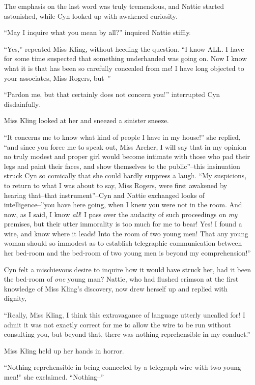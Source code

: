 The emphasis on the last word was truly tremendous, and Nattie started
astonished, while Cyn looked up with awakened curiosity.

``May I inquire what you mean by all?'' inquired Nattie stiffly.

``Yes,'' repeated Miss Kling, without heeding the question. ``I know ALL. I
have for some time suspected that something underhanded was going on.
Now I know what it is that has been so carefully concealed from me! I
have long objected to your associates, Miss Rogers, but--''

``Pardon me, but that certainly does not concern you!'' interrupted Cyn
disdainfully.

Miss Kling looked at her and sneezed a sinister sneeze.

``It concerns me to know what kind of people I have in my house!'' she
replied, ``and since you force me to speak out, Miss Archer, I will say
that in my opinion no truly modest and proper girl would become intimate
with those who pad their legs and paint their faces, and show themselves
to the public''--this insinuation struck Cyn so comically that she could
hardly suppress a laugh. ``My suspicions, to return to what I was about
to say, Miss Rogers, were first awakened by hearing that--that
instrument''--Cyn and Nattie exchanged looks of intelligence--''you have
here going, when I knew you were not in the room. And now, as I said, I
know \emph{all}! I pass over the audacity of such proceedings on \emph{my} premises,
but their utter immorality is too much for me to bear! Yes! I found a
wire, and know where it leads! Into the room of two young men! That any
young woman should so immodest as to establish telegraphic communication
between her bed-room and the bed-room of two young men is beyond my
comprehension!''

Cyn felt a mischievous desire to inquire how it would have struck her,
had it been the bed-room of \emph{one} young man? Nattie, who had flushed
crimson at the first knowledge of Miss Kling's discovery, now drew
herself up and replied with dignity,

``Really, Miss Kling, I think this extravagance of language utterly
uncalled for! I admit it was not exactly correct for me to allow the
wire to be run without consulting you, but beyond that, there was
nothing reprehensible in my conduct.''

Miss Kling held up her hands in horror.

``Nothing reprehensible in being connected by a telegraph wire with two
young men!'' she exclaimed. ``Nothing--''

